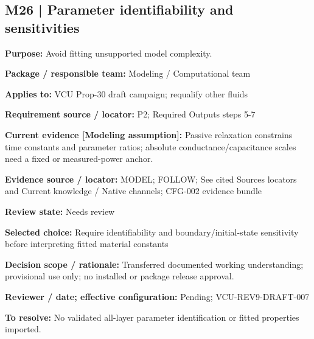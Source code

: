 \documentclass[11pt]{article}
\begin{document}
\par\noindent\begin{minipage}{\textwidth}\small\setlength{\parskip}{2pt}
\subsection*{M26 | Parameter identifiability and sensitivities}
\textbf{Purpose:} Avoid fitting unsupported model complexity.\par
\textbf{Package / responsible team:} Modeling / Computational team\par
\textbf{Applies to:} VCU Prop-30 draft campaign; requalify other fluids\par
\textbf{Requirement source / locator:} P2; Required Outputs steps 5-7\par
\textbf{Current evidence [Modeling assumption]:} Passive relaxation constrains time constants and parameter ratios; absolute conductance/capacitance scales need a fixed or measured-power anchor.\par
\textbf{Evidence source / locator:} MODEL; FOLLOW; See cited Sources locators and Current knowledge / Native channels; CFG-002 evidence bundle\par
\textbf{Review state:} Needs review\par
\textbf{Selected choice:} Require identifiability and boundary/initial-state sensitivity before interpreting fitted material constants\par
\textbf{Decision scope / rationale:} Transferred documented working understanding; provisional use only; no installed or package release approval.\par
\textbf{Reviewer / date; effective configuration:} Pending; VCU-REV9-DRAFT-007\par
\textbf{To resolve:} No validated all-layer parameter identification or fitted properties imported.\par
\end{minipage}\par\vspace{5pt}
\end{document}
